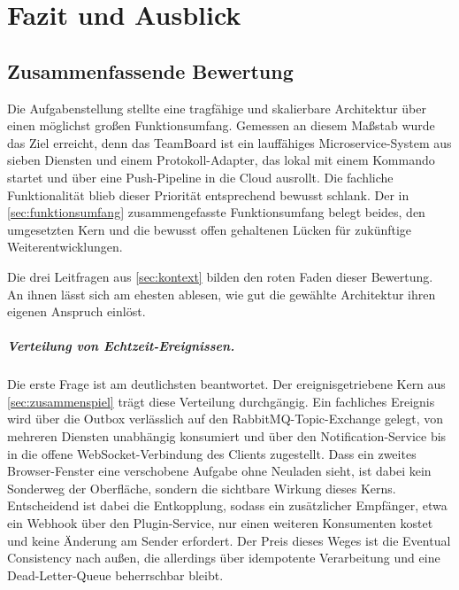 \chapter{Fazit und Ausblick}
\label{chap:fazit}

\section{Zusammenfassende Bewertung}
\label{sec:bewertung}

Die Aufgabenstellung stellte eine tragfähige und skalierbare Architektur über einen möglichst großen Funktionsumfang. Gemessen an diesem Maßstab wurde das Ziel erreicht, denn das TeamBoard ist ein lauffähiges Microservice-System aus sieben Diensten und einem Protokoll-Adapter, das lokal mit einem Kommando startet und über eine Push-Pipeline in die Cloud ausrollt. Die fachliche Funktionalität blieb dieser Priorität entsprechend bewusst schlank. Der in \vref{sec:funktionsumfang} zusammengefasste Funktionsumfang belegt beides, den umgesetzten Kern und die bewusst offen gehaltenen Lücken für zukünftige Weiterentwicklungen.

Die drei Leitfragen aus \vref{sec:kontext} bilden den roten Faden dieser Bewertung. An ihnen lässt sich am ehesten ablesen, wie gut die gewählte Architektur ihren eigenen Anspruch einlöst.

\paragraph{Verteilung von Echtzeit-Ereignissen.} Die erste Frage ist am deutlichsten beantwortet. Der ereignisgetriebene Kern aus \vref{sec:zusammenspiel} trägt diese Verteilung durchgängig. Ein fachliches Ereignis wird über die Outbox verlässlich auf den RabbitMQ-Topic-Exchange gelegt, von mehreren Diensten unabhängig konsumiert und über den Notification-Service bis in die offene WebSocket-Verbindung des Clients zugestellt. Dass ein zweites Browser-Fenster eine verschobene Aufgabe ohne Neuladen sieht, ist dabei kein Sonderweg der Oberfläche, sondern die sichtbare Wirkung dieses Kerns. Entscheidend ist dabei die Entkopplung, sodass ein zusätzlicher Empfänger, etwa ein Webhook über den Plugin-Service, nur einen weiteren Konsumenten kostet und keine Änderung am Sender erfordert. Der Preis dieses Weges ist die Eventual Consistency nach außen, die allerdings über idempotente Verarbeitung und eine Dead-Letter-Queue beherrschbar bleibt.

